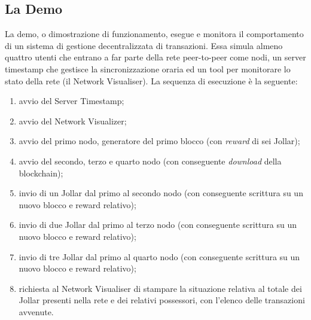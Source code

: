 \subsection{La Demo}
La demo, o dimostrazione di funzionamento, esegue e monitora il comportamento di un sistema di gestione decentralizzata di transazioni. Essa simula almeno quattro utenti che entrano a far parte della rete peer-to-peer come nodi, un server timestamp che gestisce la sincronizzazione oraria ed un tool per monitorare lo stato della rete (il Network Visualiser).
La sequenza di esecuzione è la seguente:
\begin{enumerate}
    \item avvio del Server Timestamp;
    \item avvio del Network Visualizer;
    \item avvio del primo nodo, generatore del primo blocco (con \textit{reward} di sei Jollar);
    \item avvio del secondo, terzo e quarto nodo (con conseguente \textit{download} della blockchain);
    \item invio di un Jollar dal primo al secondo nodo (con conseguente scrittura su un nuovo blocco e reward relativo);
    \item invio di due Jollar dal primo al terzo nodo (con conseguente scrittura su un nuovo blocco e reward relativo);
    \item invio di tre Jollar dal primo al quarto nodo (con conseguente scrittura su un nuovo blocco e reward relativo);
    \item richiesta al Network Visualiser di stampare la situazione relativa al totale dei Jollar presenti nella rete e dei relativi possessori, con l'elenco delle transazioni avvenute.
\end{enumerate}